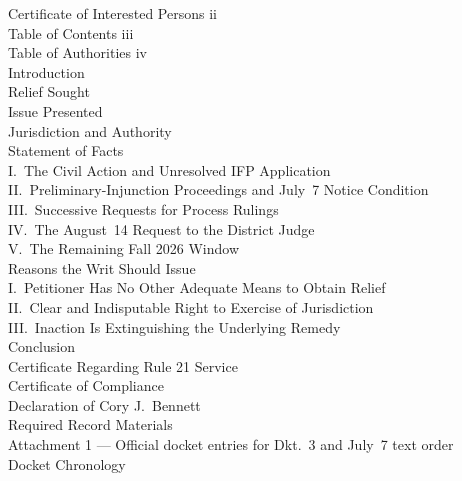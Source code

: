 \documentclass[14pt]{extarticle}
\begin{document}
\begin{singlespace}
\noindent Certificate of Interested Persons \dotfill ii\\
Table of Contents \dotfill iii\\
Table of Authorities \dotfill iv\\
Introduction \\
Relief Sought \\
Issue Presented \\
Jurisdiction and Authority \\
Statement of Facts \\
\hspace{1em}I.\ The Civil Action and Unresolved IFP Application \\
\hspace{1em}II.\ Preliminary-Injunction Proceedings and July~7 Notice Condition \\
\hspace{1em}III.\ Successive Requests for Process Rulings \\
\hspace{1em}IV.\ The August~14 Request to the District Judge \\
\hspace{1em}V.\ The Remaining Fall 2026 Window \\
Reasons the Writ Should Issue \\
\hspace{1em}I.\ Petitioner Has No Other Adequate Means to Obtain Relief \\
\hspace{1em}II.\ Clear and Indisputable Right to Exercise of Jurisdiction \\
\hspace{1em}III.\ Inaction Is Extinguishing the Underlying Remedy \\
Conclusion \\
Certificate Regarding Rule 21 Service \\
Certificate of Compliance \\
Declaration of Cory J.\ Bennett \\
Required Record Materials \\
\hspace{1em}Attachment 1 --- Official docket entries for Dkt.\ 3 and July~7 text order \\
\hspace{2em}Docket Chronology \\

\end{singlespace}
\end{document}
